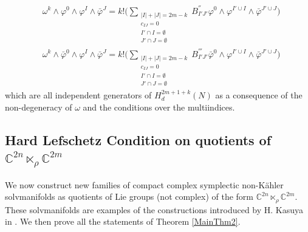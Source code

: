 \documentclass[a4paper, 11pt]{amsart}
\theoremstyle{plain}
\theoremstyle{definition}
\newcommand{\C}{\mathbb{C}}
\numberwithin{equation}{section}
\begin{document}
\begin{Proof}
\begin{equation*}
\begin{split}
        &\omega^{k} \wedge \varphi^{0} \wedge \varphi^I \wedge \bar{\varphi}^J = k!\bigg(\sum_{\substack{|I|+|J| = 2m-k \\ c_{IJ} = 0 \\I' \cap I = \emptyset \\ J' \cap J = \emptyset}} B^{''}_{I'J'}\varphi^{0} \wedge \varphi^{I' \cup I} \wedge \bar\varphi^{J' \cup J}\bigg)\\
        &\omega^{k} \wedge \bar\varphi^{0} \wedge \varphi^I \wedge \bar{\varphi}^J = k!\bigg(\sum_{\substack{|I|+|J| = 2m-k \\ c_{IJ} = 0 \\I' \cap I = \emptyset \\ J' \cap J = \emptyset}} B^{'''}_{I'J'}\bar\varphi^{0} \wedge \varphi^{I' \cup I} \wedge \bar\varphi^{J' \cup J}\bigg)
    \end{split}
    \end{equation*}
    which are all independent generators of $H^{2m+1+k}_{d}(N)$ as a consequence of the non-degeneracy of $\omega$ and the conditions over the multiindices. 
\end{Proof}


\subsection{Hard Lefschetz Condition on quotients of $\C^{2n} \ltimes_{\rho} \C^{2m}$}
We now construct new families of compact complex symplectic non-K\"ahler solvmanifolds as quotients of Lie groups (not complex) of the form $\mathbb{C}^{2n} \ltimes_{\rho} \mathbb{C}^{2m}$. These solvmanifolds are examples of the constructions introduced by H. Kasuya in \cite{Kasuya}. We then prove all the statements of Theorem \ref{MainThm2}.
\end{document}
